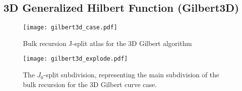 \subsection{3D Generalized Hilbert Function (Gilbert3D)}

\begin{figure*}[ht]
  \centering
  \texttt{[image: gilbert3d\_case.pdf]}
  \caption{ Bulk recursion J-split atlas for the 3D Gilbert algorithm }
  \label{fig:gilbert3DCase}
\end{figure*}

\begin{figure}[h]
  \centering
  \texttt{[image: gilbert3d\_explode.pdf]}
  \caption{ The $J_0$-split subdivision, representing the main subdivision of the bulk recursion for the 3D Gilbert curve case. }
  \label{fig:gilbert3DJSplit}
\end{figure}



